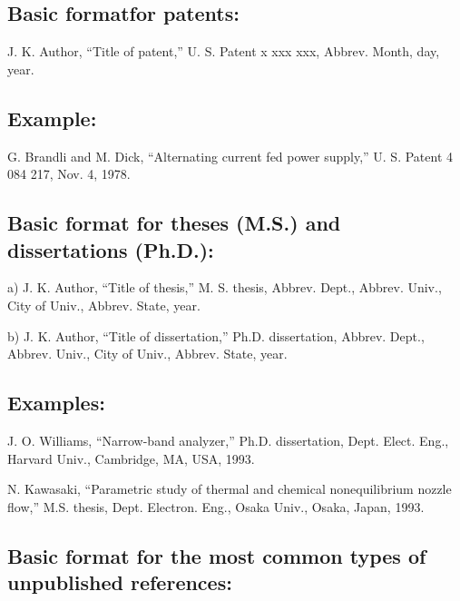 \documentclass[journal]{IEEEtran}
\begin{document}
\subsection*{Basic formatfor patents:}

J. K. Author, ``Title of patent,'' U. S. Patent x xxx xxx, Abbrev. Month, day, year.

\subsection*{Example:}

\begin{thebibliography}{34}
\setcounter{enumiv}{23}

\bibitem{}G. Brandli and M. Dick, ``Alternating current fed power supply,'' U. S. Patent 4 084 217, Nov. 4, 1978.
\end{thebibliography}

\subsection*{Basic format for theses (M.S.) and dissertations (Ph.D.):}

a) J. K. Author, ``Title of thesis,'' M. S. thesis, Abbrev. Dept., Abbrev. Univ., City of Univ., Abbrev. State, year.

b) J. K. Author, ``Title of dissertation,'' Ph.D. dissertation, Abbrev. Dept., Abbrev. Univ., City of Univ., Abbrev. State, year.

\subsection*{Examples:}

\begin{thebibliography}{34}
\setcounter{enumiv}{24}

\bibitem{}J. O. Williams, ``Narrow-band analyzer,'' Ph.D. dissertation, Dept. Elect. Eng., Harvard Univ., Cambridge, MA, USA, 1993.

\bibitem{}N. Kawasaki, ``Parametric study of thermal and chemical nonequilibrium nozzle flow,'' M.S. thesis, Dept. Electron. Eng., Osaka Univ., Osaka, Japan, 1993.
\end{thebibliography}

\subsection*{Basic format for the most common types of unpublished references:}
\end{document}
